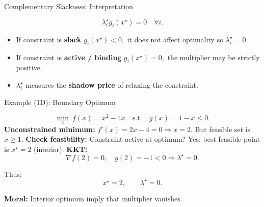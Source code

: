 \documentclass[aspectratio=169]{beamer}
\begin{document}
\begin{frame}{Complementary Slackness: Interpretation}

\[
\lambda_i^\star g_i(x^\star)=0 \quad \forall i.
\]
  \pause
\begin{itemize}
  \item If constraint is \textbf{slack}  $
        g_i(x^\star)<0,
        $
        it does not affect optimality so \(\lambda_i^\star=0\).
          \pause
  \item If constraint is \textbf{active / binding}  
        $
        g_i(x^\star)=0,
        $
        the multiplier may be strictly positive.
          \pause
  \item \(\lambda_i^\star\) measures the \textbf{shadow price} of relaxing the constraint.
\end{itemize}

\begin{center}
\end{center}

\end{frame}

\begin{frame}{Example (1D): Boundary Optimum}

\[
\min_{x} \ f(x)=x^2-4x
\quad \text{s.t.} \quad g(x)=1-x \le 0.
\]
\pause
\textbf{Unconstrained minimum:}  
\(f'(x)=2x-4=0 \Rightarrow x=2\).  
But feasible set is \(x \ge 1\).
\pause
\textbf{Check feasibility:}  
Constraint active at optimum?  
Yes: best feasible point is \(x^\star=2\) (interior).
\pause
\textbf{KKT:}
\[
\nabla f(2)=0,\quad g(2)= -1<0\Rightarrow \lambda^\star=0.
\]

Thus:
\[
x^\star=2,\qquad \lambda^\star=0.
\]

\textbf{Moral:}  
Interior optimum imply that multiplier vanishes.

\end{frame}
\end{document}

